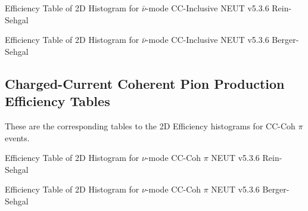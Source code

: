 \documentclass[11pt]{article}
\begin{document}
\newpage
\begin{landscape}
\begin{table}
\centering
\caption{Efficiency Table of 2D Histogram for $\bar{\nu}$-mode CC-Inclusive NEUT v5.3.6 Rein-Sehgal}
\label{tab:app:CCIncANMRS}
\begin{adjustbox}{width=\paperwidth}
\end{adjustbox}
\end{table}
\end{landscape}

\newpage
\begin{landscape}
\begin{table}
\centering
\caption{Efficiency Table of 2D Histogram for $\bar{\nu}$-mode CC-Inclusive NEUT v5.3.6 Berger-Sehgal}
\label{tab:app:CCIncANMBS}
\begin{adjustbox}{width=\paperwidth}
\end{adjustbox}
\end{table}
\end{landscape}



\subsection{Charged-Current Coherent Pion Production Efficiency Tables}
\label{sub:CCCohEffTab}

These are the corresponding tables to the 2D Efficiency histograms for CC-Coh $\pi$ events.

\newpage
\begin{landscape}
\begin{table}
\centering
\caption{Efficiency Table of 2D Histogram for $\nu$-mode CC-Coh $\pi$ NEUT v5.3.6 Rein-Sehgal}
\label{tab:app:CCCohNMRS}
\begin{adjustbox}{width=\paperwidth}
\end{adjustbox}
\end{table}
\end{landscape}

\newpage
\begin{landscape}
\begin{table}
\centering
\caption{Efficiency Table of 2D Histogram for $\nu$-mode CC-Coh $\pi$ NEUT v5.3.6 Berger-Sehgal}
\label{tab:app:CCCohNMBS}
\begin{adjustbox}{width=\paperwidth}
\end{adjustbox}
\end{table}
\end{landscape}
\end{document}
